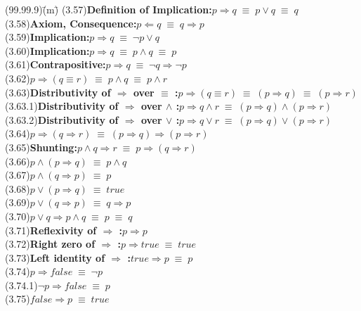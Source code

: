 \documentclass[12pt, fleqn, leqno]{article}
\newcommand{\lgap}{2pt}                             %
\newcommand{\equivs}{\ensuremath{\;\equiv\;}}       %
\newcommand{\impl}{\ensuremath{\Rightarrow}}        %
\newcommand{\foll}{\ensuremath{\Leftarrow}}         %
\begin{document}
\begin{tabbing}
(99.99.9)\;\=(m)\;\=\kill
(3.57)\>\textbf{Definition of Implication:}\quad $p\impl q \equivs p\lor q \equivs q$\\[\lgap]
(3.58)\>\textbf{Axiom, Consequence:}\quad $p\foll q \equivs q\impl p$\\[\lgap]
(3.59)\>\textbf{Implication:}\quad $p\impl q \equivs \neg p \lor q$\\[\lgap]
(3.60)\>\textbf{Implication:}\quad $p\impl q \equivs p\land q \equivs p$\\[\lgap]
(3.61)\>\textbf{Contrapositive:}\quad $p\impl q \equivs \neg q\impl \neg p$\\[\lgap]
(3.62)\>$p\impl (q\equiv r) \equivs p\land q\equivs p\land r$\\[\lgap]
(3.63)\>\textbf{Distributivity of $\impl$ over $\equiv$ :}\quad $p\impl (q\equiv r)\equivs (p\impl q)\equivs (p\impl r)$\\[\lgap]
(3.63.1)\>\textbf{Distributivity of $\impl$ over $\land$ :}\quad $p\impl q\land r\equivs (p\impl q)\land (p\impl r)$\\[\lgap]
(3.63.2)\>\textbf{Distributivity of $\impl$ over $\lor$ :}\quad $p\impl q\lor r\equivs (p\impl q)\lor (p\impl r)$\\[\lgap]
(3.64)\>$p\impl (q\impl r) \equivs (p\impl q)\impl (p\impl r)$\\[\lgap]
(3.65)\>\textbf{Shunting:}\quad $p\land q\impl r\equivs p\impl (q\impl r)$\\[\lgap]
(3.66)\>$p\land (p\impl q) \equivs p\land q$\\[\lgap]
(3.67)\>$p\land (q\impl p) \equivs p$\\[\lgap]
(3.68)\>$p\lor (p\impl q) \equivs true$\\[\lgap]
(3.69)\>$p\lor (q\impl p) \equivs q\impl p$\\[\lgap]
(3.70)\>$p\lor q \impl p\land q \equivs p \equivs q$\\[\lgap]
(3.71)\>\textbf{Reflexivity of $\impl$ :}\quad $p\impl p$\\[\lgap]
(3.72)\>\textbf{Right zero of $\impl$ :}\quad $p\impl true \equivs true$\\[\lgap]
(3.73)\>\textbf{Left identity of $\impl$ :}\quad $true\impl p \equivs p$\\[\lgap]
(3.74)\>$p\impl false \equivs \neg p$\\[\lgap]
(3.74.1)\>$\neg p\impl false \equivs p$\\[\lgap]
(3.75)\>$false\impl p \equivs true$\\[\lgap]

\end{tabbing}
\end{document}
